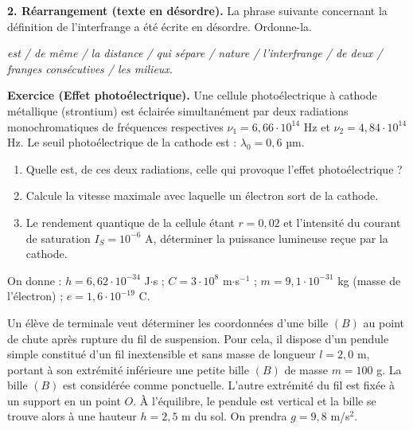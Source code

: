 \documentclass[11pt]{article}
\begin{document}
\noindent\textbf{2. Réarrangement (texte en désordre).} La phrase suivante concernant la définition de l'interfrange a été écrite en désordre. Ordonne-la.

\textit{est / de même / la distance / qui sépare / nature / l'interfrange / de deux / franges consécutives / les milieux.}


\noindent\textbf{Exercice (Effet photoélectrique).} Une cellule photoélectrique à cathode métallique (strontium) est éclairée simultanément par deux radiations monochromatiques de fréquences respectives $\nu_1 = 6{,}66\cdot10^{14}$ Hz et $\nu_2 = 4{,}84\cdot10^{14}$ Hz. Le seuil photoélectrique de la cathode est : $\lambda_0 = 0{,}6$ µm.

\begin{enumerate}
  \item Quelle est, de ces deux radiations, celle qui provoque l'effet photoélectrique ?
  \item Calcule la vitesse maximale avec laquelle un électron sort de la cathode.
  \item Le rendement quantique de la cellule étant $r = 0{,}02$ et l'intensité du courant de saturation $I_S = 10^{-6}$ A, déterminer la puissance lumineuse reçue par la cathode.
\end{enumerate}
\noindent On donne : $h = 6{,}62\cdot10^{-34}$ J$\cdot$s ; $C = 3\cdot10^8$ m$\cdot$s$^{-1}$ ; $m = 9{,}1\cdot10^{-31}$ kg (masse de l'électron) ; $e = 1{,}6\cdot10^{-19}$ C.

Un élève de terminale veut déterminer les coordonnées d'une bille $(B)$ au point de chute après rupture du fil de suspension. Pour cela, il dispose d'un pendule simple constitué d'un fil inextensible et sans masse de longueur $l = 2{,}0$ m, portant à son extrémité inférieure une petite bille $(B)$ de masse $m = 100$ g. La bille $(B)$ est considérée comme ponctuelle. L'autre extrémité du fil est fixée à un support en un point $O$. À l'équilibre, le pendule est vertical et la bille se trouve alors à une hauteur $h = 2{,}5$ m du sol. On prendra $g = 9{,}8$ m/s$^2$.

\begin{center}
\end{center}
\end{document}
